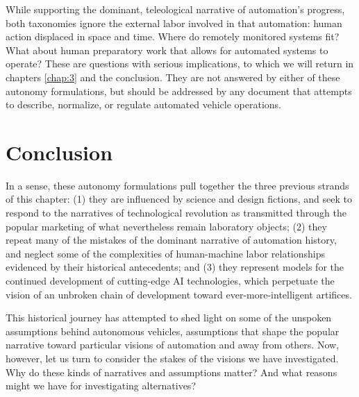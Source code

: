 While supporting the dominant, teleological narrative of automation's
progress, both
taxonomies ignore the external labor involved in that automation:
human action displaced in space and time. Where do remotely monitored
systems fit? What about human preparatory work that allows for
automated systems to operate? These are questions with serious
implications, to which we will
return in chapters \ref{chap:3} and the conclusion. They are not
answered by either of these autonomy formulations, but should be
addressed by any document that attempts to describe, normalize, or
regulate automated vehicle operations. 

\section{Conclusion}

In a sense, these autonomy
formulations pull together the three previous strands of this
chapter: (1) they are influenced by science and design fictions, and seek
to respond to the narratives of technological revolution as
transmitted through the popular marketing of what nevertheless remain laboratory
objects; (2) they repeat many of the mistakes of the dominant narrative of
automation history, and neglect some of the complexities of
human-machine labor relationships evidenced by their historical
antecedents; and (3) they represent models for the
continued development of cutting-edge AI technologies, which perpetuate
the vision of an unbroken chain of development toward
ever-more-intelligent artifices. 

This historical journey has attempted
to shed light on some of the unspoken assumptions behind autonomous
vehicles, assumptions that shape the popular narrative toward
particular visions of automation and away from others. Now, however,
let us turn to consider the stakes of the 
visions we have investigated. Why do these kinds of narratives and
assumptions matter? And what 
reasons might we have for investigating alternatives?



